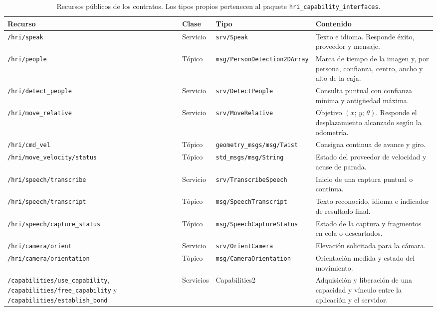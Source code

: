 \documentclass[11pt,letterpaper]{article}
\newcommand{\code}[1]{\nolinkurl{#1}}
\begin{document}
\begin{table}[htbp]
\centering\small
\caption{Recursos públicos de los contratos. Los tipos propios pertenecen al paquete \texttt{hri\_capability\_interfaces}.}\label{tab:recursos}
\begin{tabularx}{\linewidth}{@{}P{4.3cm}P{1.5cm}P{4.2cm}Y@{}}
\toprule
Recurso & Clase & Tipo & Contenido \\
\midrule
\code{/hri/speak} & Servicio & \code{srv/Speak} & Texto e idioma. Responde éxito, proveedor y mensaje. \\
\code{/hri/people} & Tópico & \code{msg/PersonDetection2DArray} & Marca de tiempo de la imagen y, por persona, confianza, centro, ancho y alto de la caja. \\
\code{/hri/detect_people} & Servicio & \code{srv/DetectPeople} & Consulta puntual con confianza mínima y antigüedad máxima. \\
\code{/hri/move_relative} & Servicio & \code{srv/MoveRelative} & Objetivo $(x;\,y;\,\theta)$. Responde el desplazamiento alcanzado según la odometría. \\
\code{/hri/cmd_vel} & Tópico & \code{geometry_msgs/msg/Twist} & Consigna continua de avance y giro. \\
\code{/hri/move_velocity/status} & Tópico & \code{std_msgs/msg/String} & Estado del proveedor de velocidad y acuse de parada. \\
\code{/hri/speech/transcribe} & Servicio & \code{srv/TranscribeSpeech} & Inicio de una captura puntual o continua. \\
\code{/hri/speech/transcript} & Tópico & \code{msg/SpeechTranscript} & Texto reconocido, idioma e indicador de resultado final. \\
\code{/hri/speech/capture_status} & Tópico & \code{msg/SpeechCaptureStatus} & Estado de la captura y fragmentos en cola o descartados. \\
\code{/hri/camera/orient} & Servicio & \code{srv/OrientCamera} & Elevación solicitada para la cámara. \\
\code{/hri/camera/orientation} & Tópico & \code{msg/CameraOrientation} & Orientación medida y estado del movimiento. \\
\code{/capabilities/use_capability}, \code{/capabilities/free_capability} y \code{/capabilities/establish_bond} & Servicios & Capabilities2 & Adquisición y liberación de una capacidad y vínculo entre la aplicación y el servidor. \\
\bottomrule
\end{tabularx}
\end{table}
\end{document}
